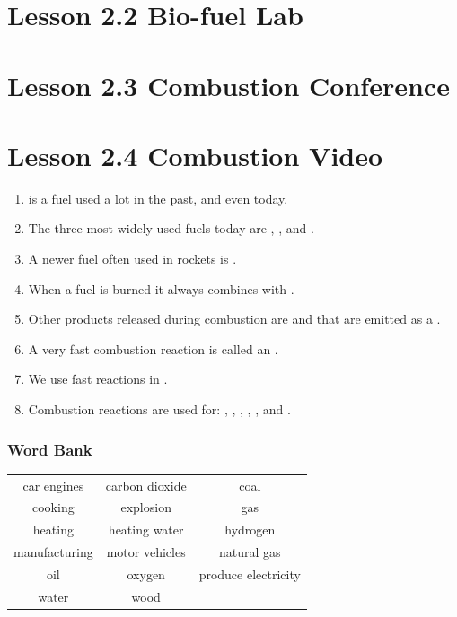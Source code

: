 \documentclass[answers,12pt]{exam}
\begin{document}
\newpage

\section*{Lesson 2.2 Bio-fuel Lab}
\section*{Lesson 2.3 Combustion Conference}
\section*{Lesson 2.4 Combustion Video}

\begin{enumerate}
    \item  \fillin[] is a fuel used a lot in the past, and even today.
    \item  The three most widely used fuels today are \fillin[], \fillin[], and \fillin[].
    \item  A newer fuel often used in rockets is \fillin[].
    \item  When a fuel is burned it always combines with \fillin[].
    \item  Other products released during combustion are \fillin[] and \fillin[] that are emitted as a \fillin[].
    \item  A very fast combustion reaction is called an \fillin[].
    \item  We use fast reactions in \fillin[].
    \item  Combustion reactions are used for:  \fillin[], \fillin[], \fillin[], \fillin[], \fillin[], and \fillin[].
\end{enumerate}

\subsubsection*{Word Bank}

\begin{tabular}{ |c c c|}
    \hline
    car engines     & carbon dioxide    & coal\\ 
    cooking         & explosion         & gas\\ 
    heating         & heating water     & hydrogen\\ 
    manufacturing   & motor vehicles    & natural gas\\ 
    oil             & oxygen            & produce electricity\\ 
    water           & wood              & \\ 
    \hline    
\end{tabular}




















    
    
\end{document}
